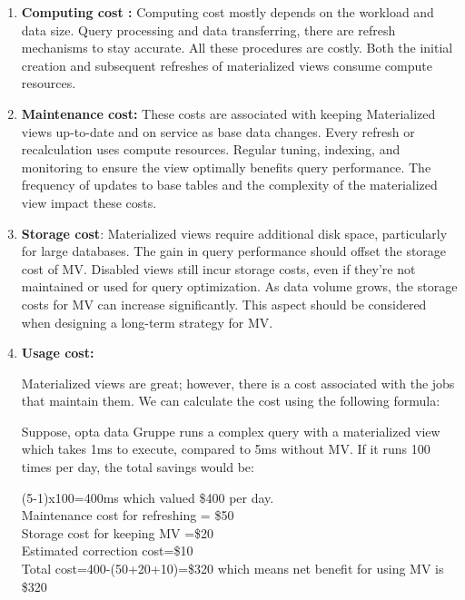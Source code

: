  \begin{enumerate}[label=\alph*)]
    \item \textbf{Computing cost :} Computing cost mostly depends on the workload and data size. Query processing and data transferring, there are refresh mechanisms to stay accurate. All these procedures are costly. Both the initial creation and subsequent refreshes of materialized views consume compute resources.
    \item \textbf{Maintenance cost:} These costs are associated with keeping Materialized views up-to-date and on service as base data changes. Every refresh or recalculation uses compute resources. Regular tuning, indexing, and monitoring to ensure the view optimally benefits query performance. The frequency of updates to base tables and the complexity of the materialized view impact these costs. 
    \item \textbf{Storage cost}: Materialized views require additional disk space, particularly for large databases. The gain in query performance should offset the storage cost of MV. Disabled views still incur storage costs, even if they're not maintained or used for query optimization. As data volume grows, the storage costs for MV can increase significantly. This aspect should be considered when designing a long-term strategy for MV. 
    
    \item \textbf{Usage cost:}\vspace{.3cm}
    
    Materialized views are great; however, there is a cost associated with the jobs that maintain them. We can calculate the cost using the following formula: \cite{10.1145/2206869.2206874}

    

  Suppose, opta data Gruppe runs a complex query with a materialized view which takes 1ms to execute, compared to 5ms without MV. If it runs 100 times per day, the total savings would be:
  
   (5-1)x100=400ms which valued \$400 per day.\\
   Maintenance cost for refreshing = \$50 \\
   Storage cost for keeping MV =\$20\\
   Estimated correction cost=\$10 \\
   Total cost={400-(50+20+10)}=\$320 which means net benefit for using MV is \$320

 
  
\end{enumerate}




